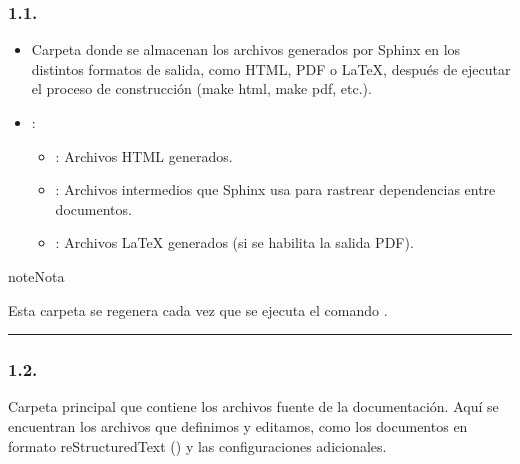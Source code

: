 \documentclass[a4paper,10pt,oneside,spanish,openany]{sphinxmanual}
\begin{document}
\subsubsection{1.1. }
\label{\detokenize{configuracion_inicial/004.estructura_inicial_proyecto:carpeta-build}}\begin{itemize}
\item {} 
\sphinxAtStartPar
Carpeta donde se almacenan los archivos generados por Sphinx en los distintos formatos de salida, como HTML, PDF o LaTeX, después de ejecutar el proceso de construcción (make html, make pdf, etc.).

\item {} 
\sphinxAtStartPar
{}:
\begin{itemize}
\item {} 
\sphinxAtStartPar
{}: Archivos HTML generados.

\item {} 
\sphinxAtStartPar
{}: Archivos intermedios que Sphinx usa para rastrear dependencias entre documentos.

\item {} 
\sphinxAtStartPar
{}: Archivos LaTeX generados (si se habilita la salida PDF).

\end{itemize}

\end{itemize}

\begin{sphinxadmonition}{note}{Nota}

\sphinxAtStartPar
Esta carpeta se regenera cada vez que se ejecuta el comando .
\end{sphinxadmonition}


\bigskip\hrule\bigskip



\subsubsection{1.2. }
\label{\detokenize{configuracion_inicial/004.estructura_inicial_proyecto:carpeta-source}}
\sphinxAtStartPar
Carpeta principal que contiene los archivos fuente de la documentación. Aquí se encuentran los archivos que definimos y editamos, como los documentos en formato reStructuredText () y las configuraciones adicionales.
\end{document}
